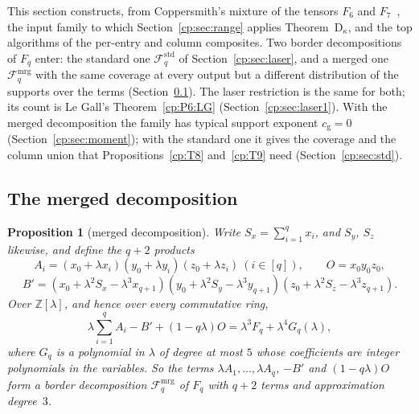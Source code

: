 \documentclass[11pt]{article}
\newtheorem{proposition}[theorem]{Proposition}
\theoremstyle{definition}
\theoremstyle{remark}
\providecommand{\Z}{\mathbb{Z}}
\newcommand{\cg}{c_{\mathrm g}}               %
\newcommand{\ThmDk}{Theorem~D\texorpdfstring{\ensuremath{_\kappa}}{\_kappa}}     %
\newcommand{\Fstd}{\mathcal{F}^{\mathrm{std}}_q} %
\newcommand{\Fmrg}{\mathcal{F}^{\mathrm{mrg}}_q} %
\newcommand{\Bp}{B'}                          %
\newcommand{\Oterm}{O}                        %
\begin{document}
This section constructs, from Coppersmith's mixture of the tensors $F_6$ and $F_7$~\cite{Cop97}, the input family to which Section~\ref{cp:sec:range} applies \ThmDk, and the top algorithms of the per-entry and column composites. Two border decompositions of $F_q$ enter: the standard one $\Fstd$ of Section~\ref{cp:sec:laser}, and a merged one $\Fmrg$ with the same coverage at every output but a different distribution of the supports over the terms (Section~\ref{cp:sec:merged}). The laser restriction is the same for both; its count is Le Gall's Theorem~\ref{cp:P6:LG} (Section~\ref{cp:sec:laser1}). With the merged decomposition the family has typical support exponent $\cg=0$ (Section~\ref{cp:sec:moment}); with the standard one it gives the coverage and the column union that Propositions~\ref{cp:T8} and~\ref{cp:T9} need (Section~\ref{cp:sec:std}).

\subsection{The merged decomposition}\label{cp:sec:merged}

\begin{proposition}[merged decomposition]\label{cp:L1}
Write $S_x=\sum_{i=1}^qx_i$, and $S_y$, $S_z$ likewise, and define the $q+2$ products
\[
A_i=(x_0+\lambda x_i)(y_0+\lambda y_i)(z_0+\lambda z_i)\ (i\in[q]),\qquad\Oterm=x_0y_0z_0,
\]
\[
\Bp=(x_0+\lambda^2S_x-\lambda^3x_{q+1})(y_0+\lambda^2S_y-\lambda^3y_{q+1})(z_0+\lambda^2S_z-\lambda^3z_{q+1}).
\]
Over $\Z[\lambda]$, and hence over every commutative ring,
\[
\lambda\sum_{i=1}^qA_i-\Bp+(1-q\lambda)\Oterm=\lambda^3F_q+\lambda^4G_q(\lambda),
\]
where $G_q$ is a polynomial in $\lambda$ of degree at most $5$ whose coefficients are integer polynomials in the variables. So the terms $\lambda A_1,\dots,\lambda A_q$, $-\Bp$ and $(1-q\lambda)\Oterm$ form a border decomposition $\Fmrg$ of $F_q$ with $q+2$ terms and approximation degree~$3$.
\end{proposition}
\end{document}

